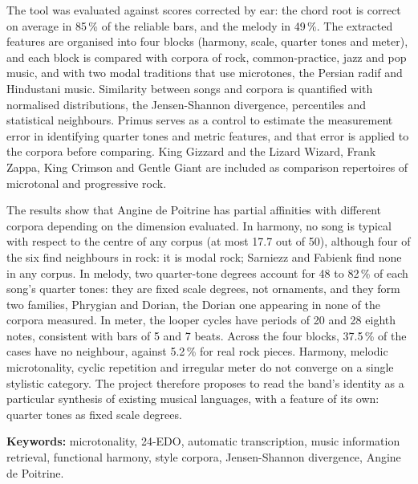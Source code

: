 The tool was evaluated against scores corrected by ear: the chord root is correct on average in 85\,\% of the reliable
bars, and the melody in 49\,\%. The extracted features are organised into four blocks (harmony, scale, quarter tones and
meter), and each block is compared with corpora of rock, common-practice, jazz and pop music, and with two modal
traditions that use microtones, the Persian radif and Hindustani music. Similarity between songs and corpora is
quantified with normalised distributions, the Jensen-Shannon divergence, percentiles and statistical neighbours. Primus
serves as a control to estimate the measurement error in identifying quarter tones and metric features, and that error is
applied to the corpora before comparing. King Gizzard and the Lizard Wizard, Frank Zappa, King Crimson and Gentle Giant
are included as comparison repertoires of microtonal and progressive rock.

The results show that Angine de Poitrine has partial affinities with different corpora depending on the dimension
evaluated. In harmony, no song is typical with respect to the centre of any corpus (at most 17.7 out of 50),
although four of the six find neighbours in rock: it is modal rock; Sarniezz and Fabienk find none in any corpus. In melody, two quarter-tone degrees
account for 48 to 82\,\% of each song's quarter tones: they are fixed scale degrees, not ornaments, and they form two
families, Phrygian and Dorian, the Dorian one appearing in none of the corpora measured. In meter, the looper cycles have
periods of 20 and 28 eighth notes, consistent with bars of 5 and 7 beats. Across the four blocks, 37.5\,\% of the cases
have no neighbour, against 5.2\,\% for real rock pieces. Harmony, melodic microtonality, cyclic repetition and irregular
meter do not converge on a single stylistic category. The project therefore proposes to read the band's identity as a
particular synthesis of existing musical languages, with a feature of its own: quarter tones as fixed scale degrees.

\medskip
\noindent\textbf{Keywords:} microtonality, 24-EDO, automatic transcription, music information retrieval, functional
harmony, style corpora, Jensen-Shannon divergence, Angine de Poitrine.
